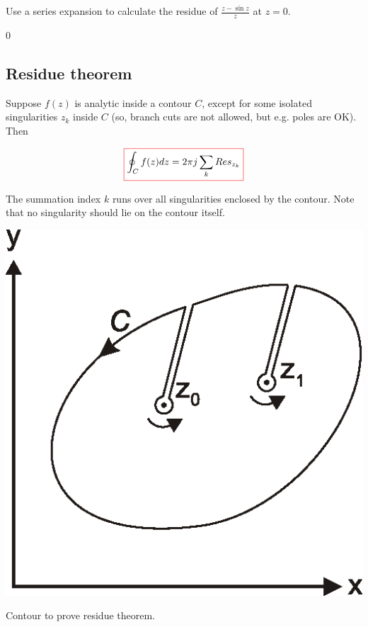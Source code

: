 \begin{exer}
  Use a series expansion to calculate the residue of $\frac{z - \sin z}{z}$ at $z=0$.
  \begin{sol}
    $0$
  \end{sol}
\end{exer}


\subsection*{Residue theorem}

Suppose $f(z)$ is analytic inside a contour ${C}$, except for some isolated singularities $z_k$ inside ${C}$ (so, branch cuts are not allowed, but e.g. poles are OK). Then

\begin{equation}
\fbox{$\displaystyle
\oint_{{C}} f(z) dz = 2 \pi j \sum_k Res_{z_k} \label{eq-res-theorem}
$}
\end{equation} 

The summation index $k$ runs over all singularities enclosed by the contour. Note that no singularity should lie on the contour itself.

\begin{marginfigure}
\centering
\includegraphics{complex/figures/residue}
\caption{Contour to prove residue theorem.}
\label{fig-residue}
\end{marginfigure}

